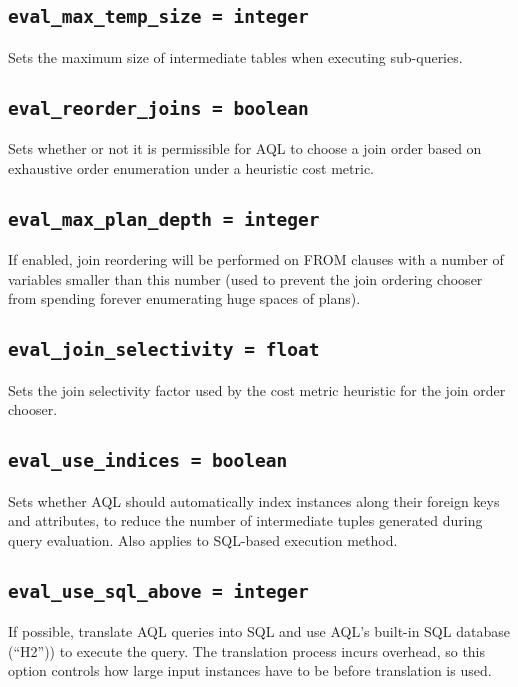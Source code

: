 \documentclass[10pt]{book}
\begin{document}
\subsection{{\tt eval\_max\_temp\_size = integer}}

Sets the maximum size of intermediate tables when executing sub-queries.

\subsection{{\tt eval\_reorder\_joins = boolean}}

Sets whether or not it is permissible for AQL to choose a join order based on exhaustive order enumeration under a heuristic cost metric.

\subsection{{\tt eval\_max\_plan\_depth = integer}}

If enabled, join reordering will be performed on FROM clauses with a number of variables smaller than this number (used to prevent the join ordering chooser from spending forever enumerating huge spaces of plans).

\subsection{{\tt eval\_join\_selectivity = float}}

Sets the join selectivity factor used by the cost metric heuristic for the join order chooser.

\subsection{{\tt eval\_use\_indices = boolean}}
			
Sets whether AQL should automatically index instances along their foreign keys and attributes, to reduce the number of intermediate tuples generated during query evaluation.
Also applies to SQL-based execution method.

\subsection{{\tt eval\_use\_sql\_above = integer}}

If possible, translate AQL queries into SQL and use AQL's built-in SQL database (``H2'')) to execute the query.  The translation process incurs overhead, so this option controls how large input instances have to be before translation is used.
\end{document}
